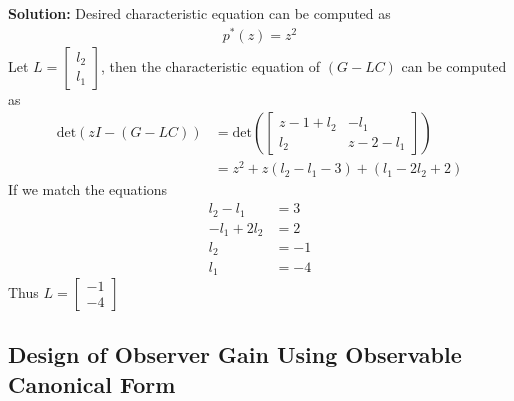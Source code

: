 \documentclass[twoside]{article}
\begin{document}
\textbf{Solution:} Desired characteristic equation can be computed as
%
\begin{align*}
  p^*(z) = z^2
\end{align*}
%
Let $L = \left[ \begin{array}{c} l_2 \\ l_1 \end{array} \right]$, then
the characteristic equation of $(G - L C)$ can be computed as
%
\begin{align*}
  \mathrm{det} \left( z I - ( G - L C ) \right) &= 
  \mathrm{det} \left(
  \left[ \begin{array}{cc} z - 1 + l_2 & -l_1 \\ l_2 & z - 2 - l_1 \end{array} \right]
  \right)
\\
&= z^2 + z (l_2 - l_1 - 3) + (l_1 - 2 l_2 + 2)
\end{align*}
%
If we match the equations
%
\begin{align*}
  l_2 - l_1 &= 3
\\
  -l_1 + 2 l_2 &= 2
\\
 l_2 &= -1
\\
 l_1 &= -4
\end{align*}
%
Thus $L = \left[ \begin{array}{c} -1 \\ -4 \end{array} \right]$

\subsection*{Design of Observer Gain Using Observable Canonical
Form}
\end{document}
